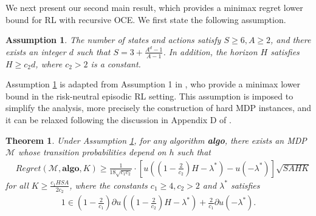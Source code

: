 \documentclass[11pt]{article}
\newtheorem{theorem}{Theorem}
\newtheorem{assumption}{Assumption}
\newcommand{\1}{\mathbbm{1}}
\newcommand{\gao}[1]{\textcolor{blue}{{#1}}} %
\begin{document}
We next present our second main result, which provides a minimax regret lower bound for RL with recursive OCE. We first state the following assumption.


\begin{assumption}\label{ASSU2}
The number of states and actions satisfy $S\geq 6,A\geq 2$, and there exists an integer $d$ such that $S=3+\frac{A^d-1}{A-1}$. In addition, the horizon $H$ satisfies $H\geq c_2 d$, where $c_2>2$ is a constant. %
\end{assumption}

Assumption \ref{ASSU2} is adapted from Assumption 1 in \cite{domingues2021episodic}, who provide a minimax lower bound in the risk-neutral episodic RL setting. 
This assumption is imposed to simplify the analysis, more precisely the construction of hard MDP instances, and it can be relaxed following the discussion in Appendix D of \cite{domingues2021episodic}.  %


\begin{theorem}\label{THM3}
Under Assumption \ref{ASSU2}, for any algorithm \textbf{algo}, there exists an MDP $\mathcal{M}$ whose transition probabilities depend on $h$ such that
\begin{align*}
&Regret(\mathcal{M},\textbf{algo},K)\geq \frac{1}{18\sqrt{c_1 c_2}}\cdot \left[u\left(\left(1-\frac{2}{c_2}\right) H-\lambda^*\right)-u(-\lambda^*)\right]\sqrt{SAHK}
\end{align*}
for all $K\geq \frac{c_1 HSA}{2c_2}$, where the constants $c_1\geq 4,c_2>2$ and $\lambda^*$ satisfies 
\begin{align*}
1\in \left(1-\frac{2}{c_1}\right)\partial u\left(\left(1-\frac{2}{c_2}\right)H-\lambda^*\right)+\frac{2}{c_1}\partial u(-\lambda^*).
\end{align*}
\end{theorem}
\end{document}
